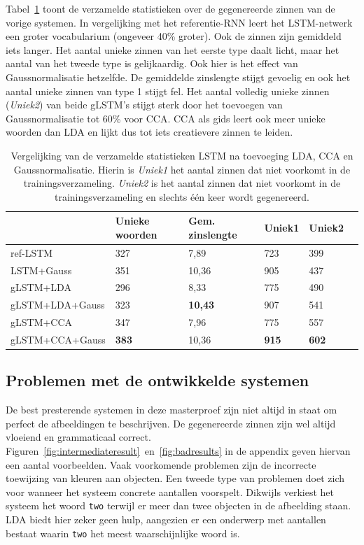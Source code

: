 Tabel~\ref{table:lstm_stats} toont de verzamelde statistieken over de gegenereerde zinnen van de vorige systemen. In vergelijking met het referentie-RNN leert het LSTM-netwerk een groter vocabularium (ongeveer 40\% groter). Ook de zinnen zijn gemiddeld iets langer. Het aantal unieke zinnen van het eerste type daalt licht, maar het aantal van het tweede type is gelijkaardig.
Ook hier is het effect van Gaussnormalisatie hetzelfde. De gemiddelde zinslengte stijgt gevoelig en ook het aantal unieke zinnen van type 1 stijgt fel. Het aantal volledig unieke zinnen (\emph{Uniek2}) van beide gLSTM's stijgt sterk door het toevoegen van Gaussnormalisatie tot 60\% voor CCA. CCA als gids leert ook meer unieke woorden dan LDA en lijkt dus tot iets creatievere zinnen te leiden.
    \begin{table}
    	\centering
    	\begin{tabular}{llllll}
    		~                   & Unieke woorden & Gem. zinslengte & Uniek1 & Uniek2 \\ \hline
    		ref-LSTM         				  & 327   & 7,89   & 723   & 399  \\
    		LSTM+Gauss        				  & 351   & 10,36   & 905   & 437  \\
    		gLSTM+LDA         				  & 296   & 8,33   & 775   & 490     \\
    		gLSTM+LDA+Gauss 				  & 323   & \textbf{10,43}   & 907   & 541     \\
    		gLSTM+CCA         				  & 347   & 7,96   & 775   &557   \\
    		gLSTM+CCA+Gauss 				  & \textbf{383}   & 10,36   & \textbf{915}   & \textbf{602}    \\\hline
    	\end{tabular}
	\caption[Vergelijking van de verzamelde statistieken LSTM na toevoeging LDA, CCA en Gaussnormalisatie]{Vergelijking van de verzamelde statistieken LSTM na toevoeging LDA, CCA en Gaussnormalisatie. Hierin is \emph{Uniek1} het aantal zinnen dat niet voorkomt in de trainingsverzameling. \emph{Uniek2} is het aantal zinnen dat niet voorkomt in de trainingsverzameling en slechts \'e\'en keer wordt gegenereerd.}
    	\label{table:lstm_stats}
    \end{table}
    
\subsection{Problemen met de ontwikkelde systemen}
De best presterende systemen in deze masterproef zijn niet altijd in staat om perfect de afbeeldingen te beschrijven.
 De gegenereerde zinnen zijn wel altijd vloeiend en grammaticaal correct.
  Figuren~\ref{fig:intermediateresult}~en~\ref{fig:badresults} in de appendix geven hiervan een aantal voorbeelden.
Vaak voorkomende problemen zijn de incorrecte toewijzing van kleuren aan objecten.
Een tweede type van problemen doet zich voor wanneer het systeem concrete aantallen voorspelt.
Dikwijls verkiest het systeem het woord \texttt{two} terwijl er meer dan twee objecten in de afbeelding staan.
LDA biedt hier zeker geen hulp, aangezien er een onderwerp met aantallen bestaat waarin \texttt{two} het meest waarschijnlijke woord is.

